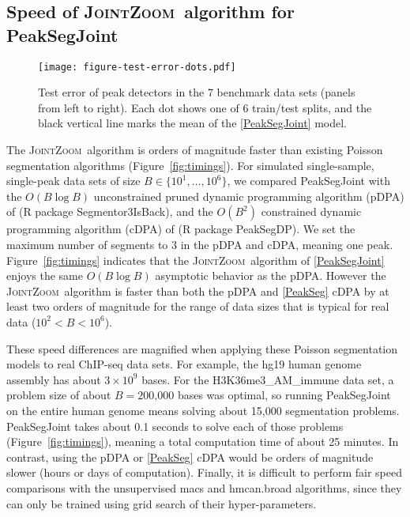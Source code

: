 \documentclass{article} %
\newcommand{\JointHeuristic}{\textsc{JointZoom}}
\begin{document}
\subsection{Speed of \JointHeuristic\ algorithm for PeakSegJoint}

\begin{figure}[b!]
  \centering
  \texttt{[image: figure-test-error-dots.pdf]}
  \vskip -0.5cm
  \caption{Test error of peak detectors in the 7  
    benchmark data sets (panels from left to right). Each dot shows
    one of 6 train/test splits, and the black vertical line marks the
    mean of the \ref{PeakSegJoint} model.}
  \label{fig:test-error-dots}
\end{figure}

The \JointHeuristic\ algorithm is orders of magnitude faster than
existing Poisson segmentation algorithms
(Figure~\ref{fig:timings}). For simulated single-sample, single-peak
data sets of size $B\in\{10^1, \dots, 10^6\}$, we compared
PeakSegJoint with the $O(B\log B)$ unconstrained pruned dynamic
programming algorithm (pDPA) of \citet{Segmentor} (R package
Segmentor3IsBack), and the $O(B^2)$ constrained dynamic programming
algorithm (cDPA) of \citet{HOCKING-PeakSeg} (R package PeakSegDP). We
set the maximum number of segments to 3 in the pDPA and cDPA, meaning
one peak. Figure~\ref{fig:timings} indicates that the \JointHeuristic\
algorithm of \ref{PeakSegJoint} enjoys the same $O(B \log B)$
asymptotic behavior as the pDPA. However the \JointHeuristic\
algorithm is faster than both the pDPA and \ref{PeakSeg} cDPA by at
least two orders of magnitude for the range of data sizes that is
typical for real data ($10^2 < B < 10^6$).

These speed differences are magnified when applying these Poisson
segmentation models to real ChIP-seq data sets. For example, the hg19
human genome assembly has about $3\times 10^9$ bases. For the
H3K36me3\_AM\_immune data set, a problem size of about
$B=\text{200,000}$ bases was optimal, so running PeakSegJoint on the
entire human genome means solving about 15,000 segmentation
problems. PeakSegJoint takes about 0.1 seconds to solve each of those
problems (Figure~\ref{fig:timings}), meaning a total computation time
of about 25 minutes. In contrast, using the pDPA or \ref{PeakSeg} cDPA
would be orders of magnitude slower (hours or days of computation).
Finally, it is difficult to perform fair speed comparisons with the
unsupervised macs and hmcan.broad algorithms, since they can only be
trained using grid search of their %
hyper-parameters.
\end{document}
